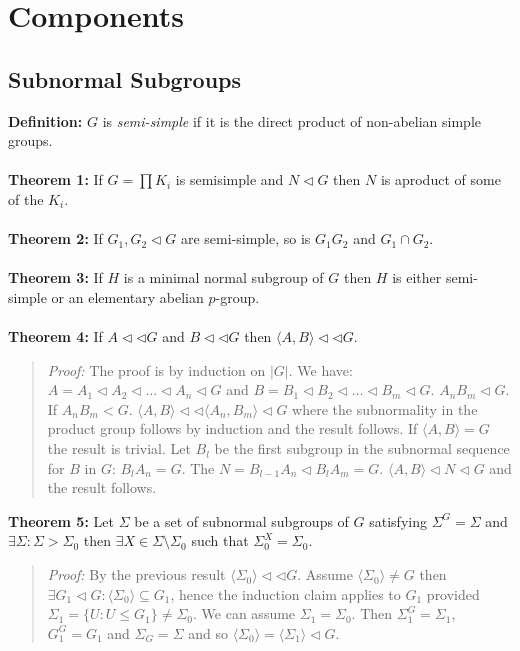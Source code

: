 \chapter{Components}
\section{Subnormal Subgroups}
{\bf Definition:} $G$ is \emph{semi-simple} if it is the direct product of non-abelian simple groups.
\\
\\
{\bf Theorem 1:} If $G= \prod K_i$ is semisimple and $N \lhd G$ then $N$ is  aproduct of some of the $K_i$.
\\
\\
{\bf Theorem 2:} If $G_1 , G_2 \lhd G$ are semi-simple, so is $G_1 G_2$ and $G_1 \cap G_2$.
\\
\\
{\bf Theorem 3:} If  $H$ is a minimal normal subgroup of $G$ then $H$ is either semi-simple or an elementary abelian
$p$-group.
\\
\\
{\bf Theorem 4:} If 
$A \lhd \lhd G$ and $B \lhd \lhd G$ then $ \langle A, B \rangle \lhd \lhd G$. 
\begin{quote}
\emph{Proof:}  
The proof is by induction on $|G|$.  We have:
$A=A_1 \lhd A_2 \lhd \ldots \lhd A_n \lhd G$
and
$B=B_1 \lhd B_2 \lhd \ldots \lhd B_m \lhd G$.  
$A_n B_m \lhd G$.  If
$A_n B_m < G$.  $ \langle A, B \rangle \lhd \lhd \langle A_n , B_m \rangle \lhd G$
where the subnormality in the product group follows by induction and the result follows.
If $ \langle A, B \rangle = G$ the result is trivial.  Let $B_l$ be the first 
subgroup in the subnormal
sequence for $B$ in $G$: $B_lA_n=G$.  The $N=B_{l-1}A_n \lhd B_l A_m =G$.
$ \langle A,B \rangle \lhd N \lhd G$ and the result follows.
\end{quote}
{\bf Theorem 5:}
Let $\Sigma$ be a set of subnormal subgroups of $G$ satisfying
$\Sigma^G=\Sigma$ and $\exists \Sigma: \Sigma > \Sigma_0$ then
$\exists X \in \Sigma \setminus \Sigma_0$ such that $\Sigma_0^X=\Sigma_0$.
\begin{quote}
\emph{Proof:}
By the previous result $ \langle \Sigma_0 \rangle \lhd \lhd G$.  
Assume $ \langle \Sigma_0 \rangle \ne G$ then 
$\exists G_1 \lhd G: \langle \Sigma_0 \rangle \subseteq G_1$, hence the induction claim applies to
$G_1$ provided $\Sigma_1 = \{ U: U \le G_1 \} \ne \Sigma_0$.  We can assume
$\Sigma_1= \Sigma_0$.  Then $\Sigma_1^G = \Sigma_1$, $G_1^G = G_1$ and $\Sigma_G = \Sigma$ and
so $ \langle \Sigma_0 \rangle = \langle \Sigma_1 \rangle \lhd G$.
\end{quote}
